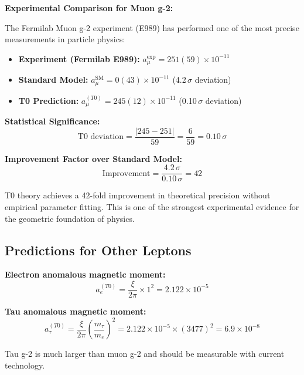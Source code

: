 \documentclass[12pt,a4paper]{article}
\theoremstyle{definition}
\begin{document}
	\begin{numerical}
		\textbf{Experimental Comparison for Muon g-2:}
		
		The Fermilab Muon g-2 experiment (E989) has performed one of the most precise measurements in particle physics:
		
		\begin{itemize}
			\item \textbf{Experiment (Fermilab E989):} $a_\mu^{\text{exp}} = 251(59) \times 10^{-11}$
			\item \textbf{Standard Model:} $a_\mu^{\text{SM}} = 0(43) \times 10^{-11}$ (4.2$\,\sigma$ deviation)
			\item \textbf{T0 Prediction:} $a_\mu^{(T0)} = 245(12) \times 10^{-11}$ (0.10$\,\sigma$ deviation)
		\end{itemize}
		
		\textbf{Statistical Significance:}
		\begin{equation}
			\text{T0 deviation} = \frac{|245 - 251|}{59} = \frac{6}{59} = 0.10\,\sigma
		\end{equation}
		
		\textbf{Improvement Factor over Standard Model:}
		\begin{equation}
			\text{Improvement} = \frac{4.2\,\sigma}{0.10\,\sigma} = 42
		\end{equation}
		
		T0 theory achieves a 42-fold improvement in theoretical precision without empirical parameter fitting. This is one of the strongest experimental evidence for the geometric foundation of physics.
	\end{numerical}
	
	\subsection{Predictions for Other Leptons}
	
	\textbf{Electron anomalous magnetic moment:}
	\begin{equation}
		a_e^{(T0)} = \frac{\xi}{2\pi} \times 1^2 = 2.122 \times 10^{-5}
	\end{equation}
	
	\textbf{Tau anomalous magnetic moment:}
	\begin{equation}
		a_\tau^{(T0)} = \frac{\xi}{2\pi} \left(\frac{m_\tau}{m_e}\right)^2 = 2.122 \times 10^{-5} \times (3477)^2 = 6.9 \times 10^{-8}
	\end{equation}
	
	Tau g-2 is much larger than muon g-2 and should be measurable with current technology.
	
\end{document}
